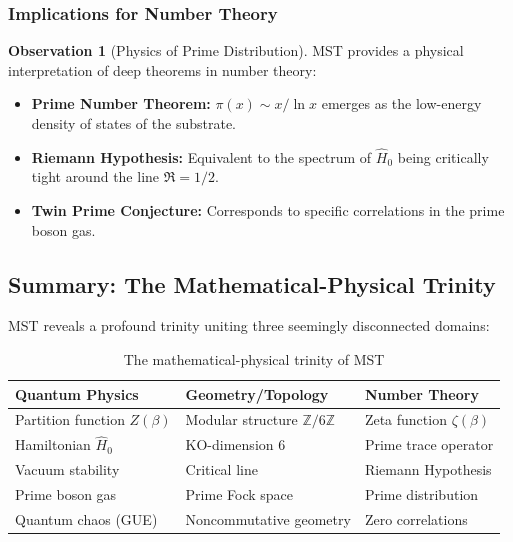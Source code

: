 \documentclass[11pt, a4paper]{article}
\theoremstyle{plain}
\theoremstyle{definition}
\newtheorem{observation}[theorem]{Observation}
\newcommand{\Zmod}{\mathbb{Z}/6\mathbb{Z}}
\begin{document}
\subsubsection{Implications for Number Theory}

\begin{observation}[Physics of Prime Distribution]
MST provides a physical interpretation of deep theorems in number theory:
\begin{itemize}
    \item \textbf{Prime Number Theorem:} $\pi(x) \sim x/\ln x$ emerges as the low-energy density of states of the substrate.
    
    \item \textbf{Riemann Hypothesis:} Equivalent to the spectrum of $\hat{H}_0$ being critically tight around the line $\Re = 1/2$.
    
    \item \textbf{Twin Prime Conjecture:} Corresponds to specific correlations in the prime boson gas.
\end{itemize}
\end{observation}

\subsection{Summary: The Mathematical-Physical Trinity}

MST reveals a profound trinity uniting three seemingly disconnected domains:

\begin{table}[H]
\centering
\caption{The mathematical-physical trinity of MST}
\label{tab:trinity}
\begin{tabular}{lll}
\toprule
\textbf{Quantum Physics} & \textbf{Geometry/Topology} & \textbf{Number Theory} \\
\midrule
Partition function $Z(\beta)$ & Modular structure $\Zmod$ & Zeta function $\zeta(\beta)$ \\
Hamiltonian $\hat{H}_0$ & KO-dimension 6 & Prime trace operator \\
Vacuum stability & Critical line & Riemann Hypothesis \\
Prime boson gas & Prime Fock space & Prime distribution \\
Quantum chaos (GUE) & Noncommutative geometry & Zero correlations \\
\bottomrule
\end{tabular}
\end{table}
\end{document}

